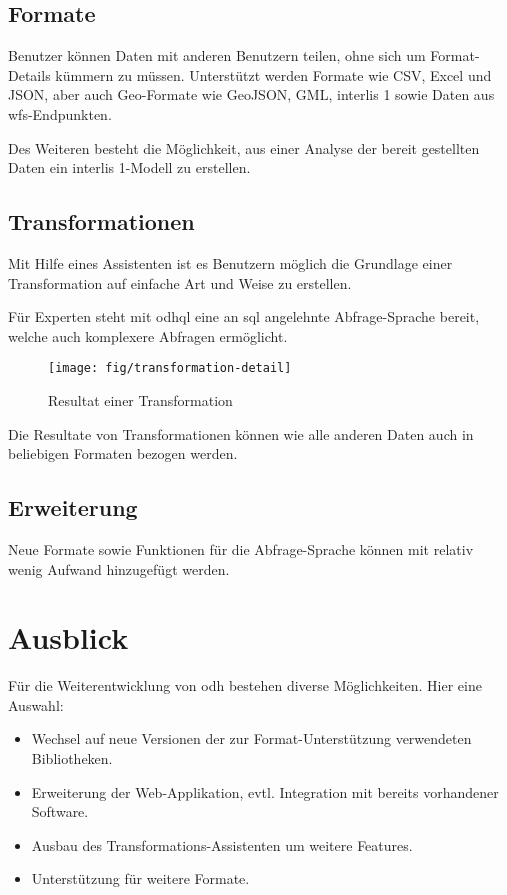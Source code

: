 \subsection*{Formate}
Benutzer können Daten mit anderen Benutzern teilen, ohne sich um Format-Details kümmern zu müssen. Unterstützt werden Formate wie CSV, Excel und JSON, aber auch Geo-Formate wie GeoJSON, GML, \gls{interlis} 1 sowie Daten aus \gls{wfs}-Endpunkten.

Des Weiteren besteht die Möglichkeit, aus einer Analyse der bereit gestellten Daten ein \gls{interlis} 1-Modell zu erstellen.

\subsection*{Transformationen}
Mit Hilfe eines Assistenten ist es Benutzern möglich die Grundlage einer Transformation auf einfache Art und Weise zu erstellen. 

Für Experten steht mit \gls{odhql} eine an \acs{sql} angelehnte Abfrage-Sprache bereit, welche auch komplexere Abfragen ermöglicht.

\begin{figure}[H]
    \centering
    \texttt{[image: fig/transformation-detail]}
    \vspace{-0.5cm}\caption*{Resultat einer Transformation}
\end{figure}

Die Resultate von Transformationen können wie alle anderen Daten auch in beliebigen Formaten bezogen werden.

\subsection*{Erweiterung}
Neue Formate sowie Funktionen für die Abfrage-Sprache können mit relativ wenig Aufwand hinzugefügt werden.

\section*{Ausblick}
Für die Weiterentwicklung von \acl{odh} bestehen diverse Möglichkeiten. Hier eine Auswahl:
\begin{itemize}
\item Wechsel auf neue Versionen der zur Format-Unterstützung verwendeten Bibliotheken.
\item Erweiterung der Web-Applikation, evtl. Integration mit bereits vorhandener Software.
\item Ausbau des Transformations-Assistenten um weitere Features.
\item Unterstützung für weitere Formate.
\end{itemize}
